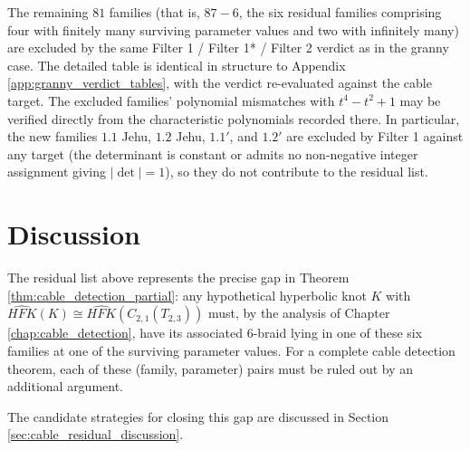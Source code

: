 The remaining $81$ families (that is, $87 - 6$, the six residual families comprising four with finitely many surviving parameter values and two with infinitely many) are excluded by the same Filter 1 / Filter 1* / Filter 2 verdict as in the granny case. The detailed table is identical in structure to Appendix \ref{app:granny_verdict_tables}, with the verdict re-evaluated against the cable target. The excluded families' polynomial mismatches with $t^4 - t^2 + 1$ may be verified directly from the characteristic polynomials recorded there. In particular, the new families $1.1$ Jehu, $1.2$ Jehu, $1.1'$, and $1.2'$ are excluded by Filter 1 against any target (the determinant is constant or admits no non-negative integer assignment giving $|\det| = 1$), so they do not contribute to the residual list.

\section{Discussion}

The residual list above represents the precise gap in Theorem \ref{thm:cable_detection_partial}: any hypothetical hyperbolic knot $K$ with $\widehat{HFK}(K) \cong \widehat{HFK}(C_{2,1}(T_{2,3}))$ must, by the analysis of Chapter \ref{chap:cable_detection}, have its associated 6-braid lying in one of these six families at one of the surviving parameter values. For a complete cable detection theorem, each of these (family, parameter) pairs must be ruled out by an additional argument.

The candidate strategies for closing this gap are discussed in Section \ref{sec:cable_residual_discussion}.